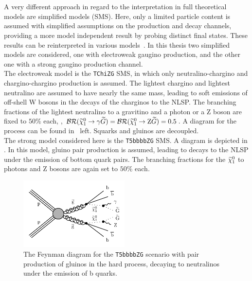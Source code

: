 \\\\A very different approach in regard to the interpretation in full theoretical models are simplified models (SMS)\cite{SMS}. Here, only a limited particle content is assumed with simplified assumptions on the production and decay channels, providing a more model independent result by probing distinct final states. These results can be reinterpreted in various models~\cite{SMSReInt}. In this thesis two simplified models are considered, one with electroweak gaugino production, and the other one with a strong gaugino production channel.\\
The electroweak model is the \texttt{TChiZG} SMS, in which only neutralino-chargino and chargino-chargino production is assumed. The lightest chargino and lightest neutralino are assumed to have nearly the same mass, leading to soft emissions of off-shell W bosons in the decays of the charginos to the NLSP. The branching fractions of the lightest neutralino to a gravitino and a photon or a Z boson are fixed to $50\%$ each, \ie, $\mathcal{BR}(\widetilde{\chi}^{0}_{1}\to\gamma\widetilde{G})=\mathcal{BR}(\widetilde{\chi}^{0}_{1}\to\mathrm{Z}\widetilde{G})=0.5$. A diagram for the process can be found in~ left. Squarks and gluinos are decoupled.\\
The strong model considered here is the \texttt{T5bbbbZG} SMS. A diagram is depicted in . In this model, gluino pair production is assumed, leading to decays to the NLSP under the emission of bottom quark pairs. The branching fractions for the $\widetilde{\chi}^{0}_{1}$ to photons and Z bosons are again set to $50\%$ each.

\begin{figure}[tbp]
 \centering
 \includegraphics[width=0.49\textwidth]{figures/signal/T5bbbbZG-crop}
 \caption{The Feynman diagram for the \texttt{T5bbbbZG} scenario with pair production of gluinos in the hard process, decaying to neutralinos under the emission of b quarks.}
 \label{fig:strongSMS}
\end{figure}


